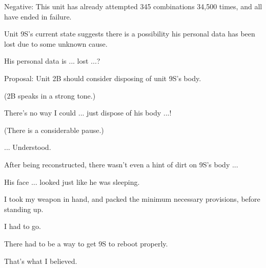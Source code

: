 \begin{play}
  Negative: This unit has already attempted 345 combinations 34,500 times, and all have ended in failure.

  Unit 9S's current state suggests there is a possibility his personal data has been lost due to some unknown cause.

  His personal data is ... lost ...?

  Proposal: Unit 2B should consider disposing of unit 9S's body.

(2B speaks in a strong tone.)

  There's no way I could ... just dispose of his body ...!

(There is a considerable pause.)

  ... Understood.

  After being reconstructed, there wasn't even a hint of dirt on 9S's body ...

  His face ... looked just like he was sleeping.

  I took my weapon in hand, and packed the minimum necessary provisions, before standing up.

  I had to go.

  There had to be a way to get 9S to reboot properly.

  That's what I believed.
\end{play}


